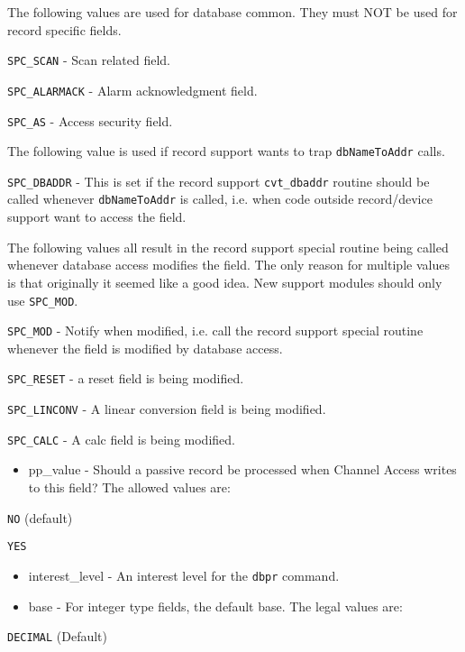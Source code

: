 
The following values are used for database common. They must NOT be used for record specific fields.

\verb|SPC_SCAN| - Scan related field.

\verb|SPC_ALARMACK| - Alarm acknowledgment field.

\verb|SPC_AS| - Access security field.


The following value is used if record support wants to trap \verb|dbNameToAddr| calls.

\verb|SPC_DBADDR| - This is set if the record support \verb|cvt_dbaddr| routine should be called whenever 
\verb|dbNameToAddr| is called, i.e. when code outside record/device support want to access the field.


The following values all result in the record support special routine being called whenever database access 
modifies the field. The only reason for multiple values is that originally it seemed like a good idea. New 
support modules should only use \verb|SPC_MOD|.

\verb|SPC_MOD| - Notify when modified, i.e. call the record support special routine whenever the field is modified 
by database access.

\verb|SPC_RESET| - a reset field is being modified.

\verb|SPC_LINCONV| - A linear conversion field is being modified.

\verb|SPC_CALC| - A calc field is being modified.

\begin{itemize}\item {}pp\_value - Should a passive record be processed when Channel Access writes to this field?  The allowed values 
are:

\end{itemize}\verb|NO| (default)

\verb|YES|

\begin{itemize}\item {}interest\_level - An interest level for the \verb|dbpr| command.

\item {}base - For integer type fields, the default base. The legal values are:

\end{itemize}\verb|DECIMAL| (Default)

